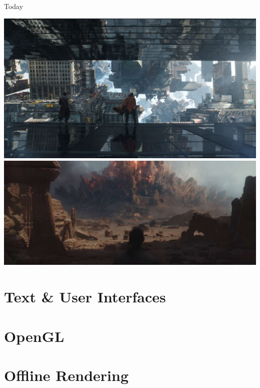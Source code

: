 \documentclass{lug}
\begin{document}
\begin{frame}{Today}
\begin{minipage}{.35\textwidth}
        \includegraphics[width=\textwidth]{graphics/dr_strange} \\
        \includegraphics[width=\textwidth]{graphics/rogue_one_boom}
    \end{minipage}
\end{frame}

\section{Text \& User Interfaces}

\section{OpenGL}

\section{Offline Rendering}
\end{document}
